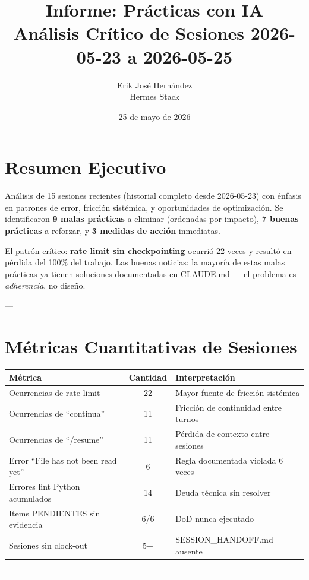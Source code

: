 \documentclass[12pt,a4paper,spanish]{article}
\title{\textbf{Informe: Prácticas con IA}\\Análisis Crítico de Sesiones 2026-05-23 a 2026-05-25}
\author{Erik José Hernández\\Hermes Stack}
\date{25 de mayo de 2026}
\begin{document}
\maketitle

\section*{Resumen Ejecutivo}

Análisis de 15 sesiones recientes (historial completo desde 2026-05-23) con énfasis en patrones de error, fricción sistémica, y oportunidades de optimización. Se identificaron \textbf{9 malas prácticas} a eliminar (ordenadas por impacto), \textbf{7 buenas prácticas} a reforzar, y \textbf{3 medidas de acción} inmediatas.

El patrón crítico: \textbf{rate limit sin checkpointing} ocurrió 22 veces y resultó en pérdida del 100\% del trabajo. Las buenas noticias: la mayoría de estas malas prácticas ya tienen soluciones documentadas en CLAUDE.md — el problema es \emph{adherencia}, no diseño.

---

\section{Métricas Cuantitativas de Sesiones}

\begin{center}
\begin{tabular}{|l|c|p{4cm}|}
\hline
\textbf{Métrica} & \textbf{Cantidad} & \textbf{Interpretación} \\
\hline
Ocurrencias de rate limit & 22 & Mayor fuente de fricción sistémica \\
Ocurrencias de ``continua'' & 11 & Fricción de continuidad entre turnos \\
Ocurrencias de ``/resume'' & 11 & Pérdida de contexto entre sesiones \\
Error ``File has not been read yet'' & 6 & Regla documentada violada 6 veces \\
Errores lint Python acumulados & 14 & Deuda técnica sin resolver \\
Items PENDIENTES sin evidencia & 6/6 & DoD nunca ejecutado \\
Sesiones sin clock-out & 5+ & SESSION\_HANDOFF.md ausente \\
\hline
\end{tabular}
\end{center}

---
\end{document}
